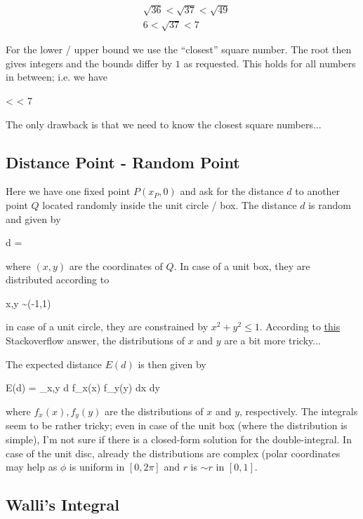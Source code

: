 \begin{align*}
  &\sqrt{36} < \sqrt{37} < \sqrt{49} \\
  & 6 < \sqrt{37} < 7
\end{align*}

For the lower / upper bound we use the ``closest'' square number. The root then gives integers and the bounds differ by $1$ as requested. This holds for all numbers in between; i.e. we have

 <  \cdots {} < 7
\eee

The only drawback is that we need to know the closest square numbers... 

\subsection{Distance Point - Random Point}

Here we have one fixed point $P(x_P,0)$ and ask for the distance $d$ to another point $Q$ located randomly inside the unit circle / box. The distance $d$ is random and given by

\bee
d = 
\eee

where $(x,y)$ are the coordinates of $Q$. In case of a unit box, they are distributed according to

\bee
x,y \sim \Uc(-1,1)
\eee

in case of a unit circle, they are constrained by $x^2 + y^2 \leq 1$. According to \href{https://stats.stackexchange.com/questions/481543/generating-random-points-uniformly-on-a-disk}{this} Stackoverflow answer, the distributions of $x$ and $y$ are a bit more tricky...

The expected distance $E(d)$ is then given by

\bee
E(d) = \int_{x,y} d f_x(x) f_y(y) dx dy
\eee

where $f_x(x), f_y(y)$ are the distributions of $x$ and $y$, respectively. The integrals seem to be rather tricky; even in case of the unit box (where the distribution is simple), I'm not sure if there is a closed-form solution for the double-integral. In case of the unit disc, already the distributions are complex (polar coordinates may help as $\phi$ is uniform in $[0, 2\pi]$ and $r$ is $\sim  r$ in $[0,1]$.


\subsection{Walli's Integral}


